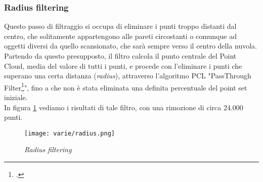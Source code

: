 \subsubsection{Radius filtering}
Questo passo di filtraggio si occupa di eliminare i punti troppo distanti dal centro, che solitamente appartengono alle pareti circostanti o comunque ad oggetti diversi da quello scansionato, che sarà sempre verso il centro della nuvola.\\
Partendo da questo presupposto, il filtro calcola il punto centrale del Point Cloud, media del valore di tutti i punti, e procede con l'eliminare i punti che superano una certa distanza (\emph{radius}), attraverso l'algoritmo PCL "PassThrough Filter\footcite{http://pointclouds.org/documentation/tutorials/passthrough.php/passthrough}", fino a che non è stata eliminata una definita percentuale del point set iniziale.\\
In figura \ref{fig:radius} vediamo i risultati di tale filtro, con una rimozione di circa 24.000 punti.
\begin{figure}[!h] 
    \centering 
    \texttt{[image: varie/radius.png]} 
    \caption{\emph{Radius filtering}}
    \label{fig:radius}
\end{figure}
